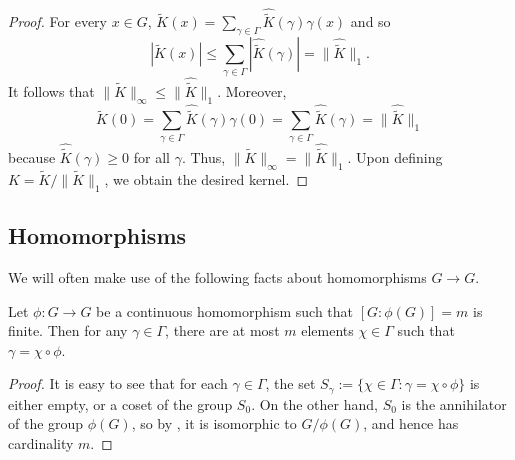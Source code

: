 \begin{proof}
    For every $x \in G$, $\widetilde{K}(x) = \sum_{\gamma \in \Gamma} \widehat{\widetilde{K}}(\gamma) \gamma(x)$ and so 
\[
    |\widetilde{K}(x)| \leq \sum_{\gamma \in \Gamma} |\widehat{\widetilde{K}}(\gamma)| = \lVert \widehat{\widetilde{K}} \rVert_1.
\]
It follows that $\lVert \widetilde{K} \rVert_{\infty} \leq \lVert \widehat{\widetilde{K}} \rVert_1$.
Moreover,
\[
    \widetilde{K}(0) = \sum_{\gamma \in \Gamma} \widehat{\widetilde{K}}(\gamma) \gamma(0) = \sum_{\gamma \in \Gamma} \widehat{\widetilde{K}}(\gamma) = \lVert \widehat{\widetilde{K}} \rVert_1
\]
because $\widehat{\widetilde{K}}(\gamma) \geq 0$ for all $\gamma$. Thus, $\lVert \widetilde{K} \rVert_{\infty} = \lVert \widehat{\widetilde{K}} \rVert_1$. Upon defining $K = \widetilde{K}/\lVert \widetilde{K} \rVert_{1}$,
    we obtain the desired kernel.
\end{proof}


\subsection{Homomorphisms} We will often make use of the following facts about homomorphisms $G \rightarrow G$.

\begin{lemma}\label{lem:homo-solutions}
Let $\phi: G \rightarrow G$ be a continuous homomorphism such that $[G:\phi(G)] = m$ is finite. Then for any $\gamma \in \Gamma$, there are at most $m$ elements $\chi \in \Gamma$ such that $\gamma = \chi \circ \phi$.
\end{lemma}
\begin{proof}
It is easy to see that for each $\gamma \in \Gamma$, the set $S_\gamma := \{ \chi \in \Gamma : \gamma = \chi \circ \phi\}$ is either empty, or a coset of the group $S_0$. On the other hand, $S_0$ is the annihilator of the group $\phi(G)$, so by \cite[Theorem 2.1.2]{rudin}, it is isomorphic to $G/\phi(G)$, and hence has cardinality $m$.
\end{proof}


